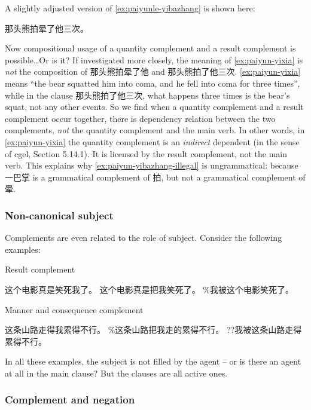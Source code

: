 \documentclass[../main.tex]{subfiles}
\begin{document}
A slightly adjusted version of \eqref{ex:paiyunle-yibazhang} is shown here:
\begin{exe}
    \ex 那头熊拍晕了他三次。
    \label{ex:paiyun-yixia}
\end{exe}
Now compositional usage of a quantity complement and a result complement is possible\dots Or is it?
If investigated more closely, the meaning of \eqref{ex:paiyun-yixia} is \emph{not} the composition 
of 那头熊拍晕了他 and 那头熊拍了他三次. \eqref{ex:paiyun-yixia} means ``the bear squatted him into
coma, and he fell into coma for three times'', while in the clause 那头熊拍了他三次, what happens 
three times is the bear's squat, not any other events. So we find when a quantity complement 
and a result complement occur together, there is dependency relation between the two complements, 
\emph{not} the quantity complement and the main verb. In other words, in \eqref{ex:paiyun-yixia}
the quantity complement is an \emph{indirect} dependent (in the sense of \ac{cgel}, Section 5.14.1). 
It is licensed by the result complement, not the main verb. This explains why \eqref{ex:paiyun-yibazhang-illegal}
is ungrammatical: because 一巴掌 is a grammatical complement of 拍, but not a grammatical complement of 晕.

\subsubsection{Non-canonical subject}

Complements are even related to the role of subject. Consider the following examples:
\begin{exe}
    \ex Result complement
    \begin{xlist}
        \ex 这个电影真是笑死我了。
        \ex 这个电影真是把我笑死了。
        \ex \%我被这个电影笑死了。 %
    \end{xlist}
    \ex Manner and consequence complement 
    \begin{xlist}
        \ex 这条山路走得我累得不行。
        \ex \%这条山路把我走的累得不行。 %
        \ex ??我被这条山路走得累得不行。
    \end{xlist}
\end{exe}

In all these examples, the subject is not filled by the agent -- or is there an agent at all in the main clause?
But the clauses are all active ones. 

\subsubsection{Complement and negation}
\end{document}

